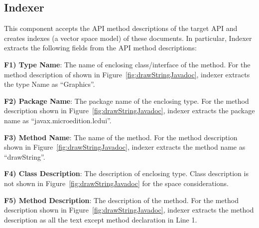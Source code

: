 \subsection{Indexer}
\label{sub:Approach_Indexer}

This component accepts the API method descriptions of the target API
and creates indexes (a vector space model) of these documents.
In particular, Indexer extracts the following fields from the API method descriptions:

 
\textbf{F1) Type Name}: The name of enclosing class/interface of the method. For the method description of  shown in Figure~\ref{fig:drawStringJavadoc}, indexer extracts the type Name as ``Graphics''.
	
\textbf{F2) Package Name}: The package name of the enclosing type. For the method description shown in Figure~\ref{fig:drawStringJavadoc}, indexer extracts the package name as ``javax.microedition.lcdui''.
	
\textbf{F3) Method Name}: The name of the method. For the method description shown in Figure~\ref{fig:drawStringJavadoc}, indexer extracts the method name as ``drawString''.
	
%	
%	
%	
	
\textbf{F4) Class Description}: The description of enclosing type. Class description is not shown in Figure~\ref{fig:drawStringJavadoc} for the space considerations.
	
\textbf{F5) Method Description}: The description of the method. For the method description shown in Figure~\ref{fig:drawStringJavadoc}, indexer extracts the method description as all the text except method declaration in Line 1.


